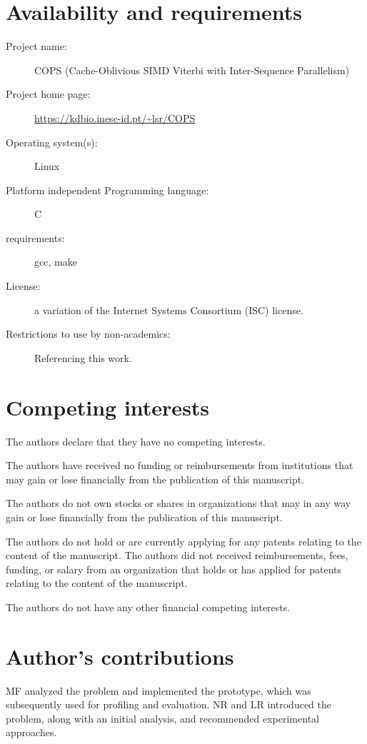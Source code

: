 \documentclass{bmcart}
\begin{document}
\bigskip


\begin{backmatter}
\section*{Availability and requirements}

\begin{description}
\item [Project name:] COPS (Cache-Oblivious SIMD Viterbi with Inter-Sequence Parallelism)
\item [Project home page:] \url{https://kdbio.inesc-id.pt/~lsr/COPS}
\item [Operating system(s):] Linux
\item [Platform independent Programming language:] C
\item [requirements:] gcc, make
\item [License:] a variation of the Internet Systems Consortium (ISC)
  license.
\item[Restrictions to use by non-academics:] Referencing this work.
\end{description}

\section*{Competing interests}
The authors declare that they have no competing interests.

The authors have received no funding or reimbursements from institutions that may  gain or lose financially from the publication of this manuscript.

The authors do not own stocks or shares in organizations that  may in any way gain or lose financially from the publication of this manuscript.

The authors do not hold or are currently applying for any patents relating to the content of the manuscript. The authors did not received reimbursements, fees, funding, or salary from an organization that holds or has applied for patents relating to the content of the manuscript.

The authors do not have any other financial competing interests.

\section*{Author's contributions}
MF analyzed the problem and implemented the prototype, which was subsequently used for profiling and evaluation. NR and LR introduced the problem, along with an initial analysis, and recommended experimental approaches.


\end{backmatter}
\end{document}
